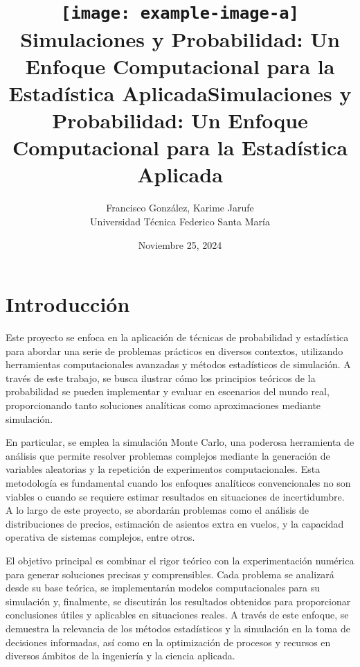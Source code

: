 \documentclass[12pt]{article}
\begin{document}
\title[Brief Article]{\texttt{[image: example-image-a]}\\ \textbf{Simulaciones y Probabilidad: Un Enfoque Computacional para la Estadística Aplicada}}


\title{\textbf{Simulaciones y Probabilidad: Un Enfoque Computacional para la Estadística Aplicada} \\ }
\author{Francisco González, Karime Jarufe\\ Universidad Técnica Federico Santa María}
\date{Noviembre 25, 2024}

\maketitle

\newpage
\tableofcontents
\newpage

\section{Introducción}

Este proyecto se enfoca en la aplicación de técnicas de probabilidad y estadística para abordar una serie de problemas prácticos en diversos contextos, utilizando herramientas computacionales avanzadas y métodos estadísticos de simulación. A través de este trabajo, se busca ilustrar cómo los principios teóricos de la probabilidad se pueden implementar y evaluar en escenarios del mundo real, proporcionando tanto soluciones analíticas como aproximaciones mediante simulación.

En particular, se emplea la simulación Monte Carlo, una poderosa herramienta de análisis que permite resolver problemas complejos mediante la generación de variables aleatorias y la repetición de experimentos computacionales. Esta metodología es fundamental cuando los enfoques analíticos convencionales no son viables o cuando se requiere estimar resultados en situaciones de incertidumbre. A lo largo de este proyecto, se abordarán problemas como el análisis de distribuciones de precios, estimación de asientos extra en vuelos, y la capacidad operativa de sistemas complejos, entre otros.

El objetivo principal es combinar el rigor teórico con la experimentación numérica para generar soluciones precisas y comprensibles. Cada problema se analizará desde su base teórica, se implementarán modelos computacionales para su simulación y, finalmente, se discutirán los resultados obtenidos para proporcionar conclusiones útiles y aplicables en situaciones reales. A través de este enfoque, se demuestra la relevancia de los métodos estadísticos y la simulación en la toma de decisiones informadas, así como en la optimización de procesos y recursos en diversos ámbitos de la ingeniería y la ciencia aplicada.
\end{document}
